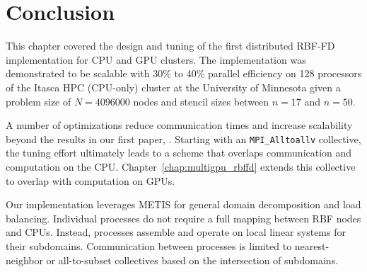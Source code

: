 \documentclass{report}
\begin{document}
\section{Conclusion}

This chapter covered the design and tuning of the first distributed RBF-FD implementation for CPU and GPU clusters. The implementation was demonstrated to be scalable with 30\% to 40\% parallel efficiency on 128 processors of the Itasca HPC (CPU-only) cluster at the University of Minnesota given a problem size of $N=4096000$ nodes and stencil sizes between $n=17$ and $n=50$. 

A number of optimizations reduce communication times and increase scalability beyond the results in our first paper, \cite{BolligFlyerErlebacher2012}. Starting with an \texttt{MPI\_Alltoallv} collective, the tuning effort ultimately leads to a scheme that overlaps communication and computation on the CPU. Chapter~\ref{chap:multigpu_rbffd} extends this collective to overlap with computation on GPUs. 

Our implementation leverages METIS for general domain decomposition and load balancing. Individual processes do not require a full mapping between RBF nodes and CPUs. Instead, processes assemble and operate on local linear systems for their subdomains. Communication between processes is limited to nearest-neighbor or all-to-subset collectives based on the intersection of subdomains. 
		



\ifstandalone


\end{document}
